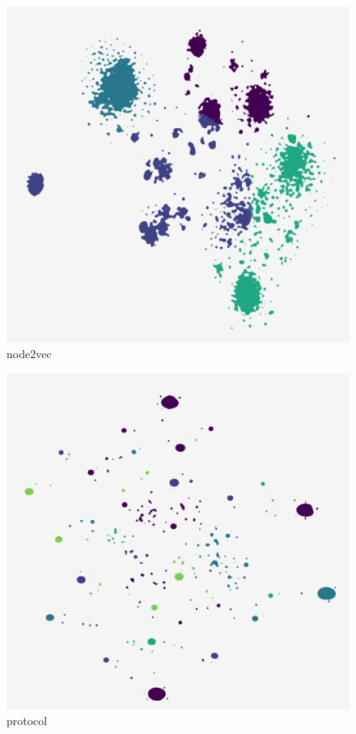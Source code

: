 \begin{subfigure}[b]{.25\linewidth}
    \centering
    \includegraphics[width=\textwidth]{outputs/DRplots/plots/t-SNE_node2vec.png}
    \caption{node2vec}
    \label{fig:t-SNE_node2vec}
\end{subfigure}
\begin{subfigure}[b]{.25\linewidth}
    \centering
    \includegraphics[width=\textwidth]{outputs/DRplots/plots/t-SNE_protocol.png}
    \caption{protocol}
    \label{fig:t-SNE_protocol}
\end{subfigure}
